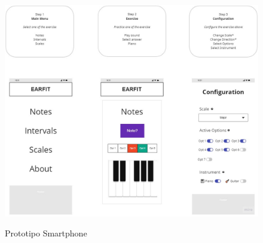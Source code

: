 \documentclass[12pt,twoside,titlepage]{report}
\begin{document}

    
    \begin{figure}[H]
        \centering
        \includegraphics[scale=0.37]{Wireframes}
        \label{fig:Prototipo}
        \caption{Prototipo Smartphone}
    \end{figure}
    
\end{document}
